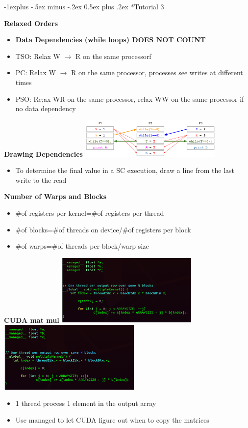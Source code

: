\documentclass[10pt, landscape]{article}
\makeatletter
\renewcommand{\subsection}{\@startsection{subsection}{2}{0mm}%
                                {-1explus -.5ex minus -.2ex}%
                                {0.5ex plus .2ex}%
                                {\normalfont\normalsize\bfseries}}
\makeatother
\begin{document}
\begin{multicols}{4}
\subsection*{Tutorial 3}

\textbf{Relaxed Orders}
\begin{itemize}
    \item \textbf{Data Dependencies (while loops) DOES NOT COUNT}
    \item TSO: Relax W $\rightarrow$ R on the same processorf
    \item PC: Relax W $\rightarrow$ R on the same processor, processes see writes at different times
    \item PSO: Re;ax WR on the same processor, relax WW on the same processor if no data dependency
\end{itemize}


\textbf{Drawing Dependencies}
\includegraphics*[width=7cm]{drawing_dependencies.png}
\begin{itemize}
    \item To determine the final value in a SC execution, draw a line from the last write to the read
\end{itemize}


\textbf{Number of Warps and Blocks}
\begin{itemize}
    \item \#of registers per kernel=\#of registers per thread 
    \item \#of blocks=\#of threads on device/\#of registers per block 
    \item \#of warps=\#of threads per block/warp size
\end{itemize}

\textbf{CUDA mat mul}
\includegraphics*[width=7cm]{cuda_t3_1.png}
\includegraphics*[width=7cm]{cuda_t3_2.png}
\begin{itemize}
    \item 1 thread process 1 element in the output array 
    \item Use managed to let CUDA figure out when to copy the matrices
\end{itemize}



\end{multicols}
\end{document}
